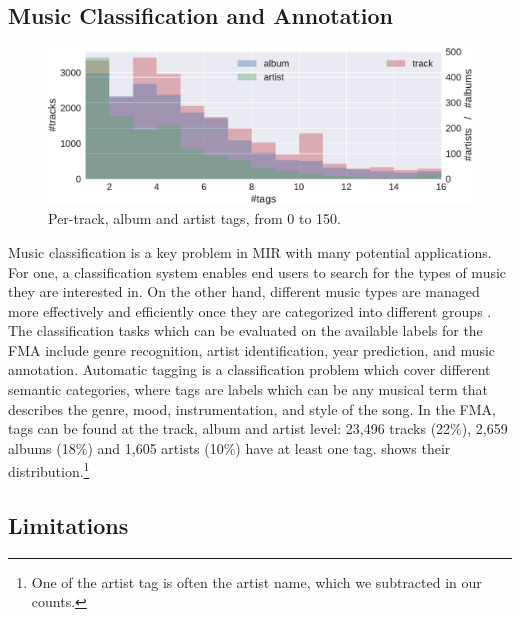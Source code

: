 \documentclass{article}
\begin{document}
\subsection{Music Classification and Annotation}

\begin{figure}
	\centering
	\includegraphics[width=\linewidth]{tag_distribution.pdf}
	\caption{Per-track, album and artist tags, from 0 to 150.}
	\label{fig:tag_distribution}
\end{figure}

Music classification is a key problem in MIR with many potential applications. For one, a classification system enables end users to search for the types of music they are interested in. On the other hand, different music types are managed more effectively and efficiently once they are categorized into different groups \cite{mir_review_classif}.
The classification tasks which can be evaluated on the available labels for the FMA include genre recognition, artist identification, year prediction, and music annotation. Automatic tagging is a classification problem which cover different semantic categories, where tags are labels which can be any musical term that describes the genre, mood, instrumentation, and style of the song.
In the FMA, tags can be found at the track, album and artist level: 23,496 tracks (22\%), 2,659 albums (18\%) and 1,605 artists (10\%) have at least one tag.  shows their distribution.\footnote{One of the artist tag is often the artist name, which we subtracted in our counts.}

\subsection{Limitations}
\end{document}
